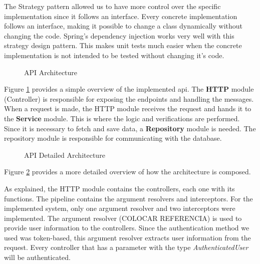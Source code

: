 The Strategy pattern allowed us to have more control over the specific implementation since it follows an interface. Every concrete implementation follows an interface, making it possible to change a class dynamically without changing the code. Spring's dependency injection works very well with this strategy design pattern. This makes unit tests much easier when the concrete implementation is not intended to be tested without changing it's code.

\begin{figure}[H]
    \begin{center}
        \resizebox{15cm}{!}{}
    \end{center}
    \caption{API Architecture}
    \label{fig:api_architecture}
\end{figure}

Figure \ref{fig:api_architecture} provides a simple overview of the implemented \acs{api}. The \textbf{HTTP} module (Controller) is responsible for exposing the endpoints and handling the messages. When a request is made, the HTTP module receives the request and hands it to the \textbf{Service} module. This is where the logic and verifications are performed. Since it is necessary to fetch and save data, a \textbf{Repository} module is needed. The repository module is responsible for communicating with the database.

\vspace{3mm}

\begin{figure}[H]
    \begin{center}
        \resizebox{15cm}{!}{}
    \end{center}
    \caption{API Detailed Architecture}
    \label{fig:api_detailed_architecture}
\end{figure}

Figure \ref{fig:api_detailed_architecture} provides a more detailed overview of how the architecture is composed. 

As explained, the HTTP module contains the controllers, each one with its functions. The pipeline contains the argument resolvers and interceptors. For the implemented system, only one argument resolver and two interceptors were implemented. The argument resolver (COLOCAR REFERENCIA) is used to provide user information to the controllers. Since the authentication method we used was token-based, this argument resolver extracts user information from the request. Every controller that has a parameter with the type \textit{AuthenticatedUser} will be authenticated. 

